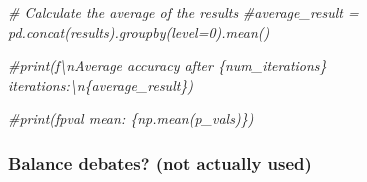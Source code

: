 \documentclass[
]{article}
\newenvironment{Shaded}{\begin{snugshade}}{\end{snugshade}}
\newcommand{\CommentTok}[1]{\textcolor[rgb]{0.56,0.35,0.01}{\textit{#1}}}
\begin{document}
\begin{Shaded}
\begin{Highlighting}[]
\CommentTok{\# Calculate the average of the results}
\CommentTok{\#average\_result = pd.concat(results).groupby(level=0).mean()}

\CommentTok{\#print(f\textquotesingle{}\textbackslash{}nAverage accuracy after \{num\_iterations\} iterations:\textbackslash{}n\{average\_result\}\textquotesingle{})}

\CommentTok{\#print(f\textquotesingle{}pval mean: \{np.mean(p\_vals)\}\textquotesingle{})}
\end{Highlighting}
\end{Shaded}

\subsubsection{Balance debates? (not actually
used)}\label{balance-debates-not-actually-used}
\end{document}

